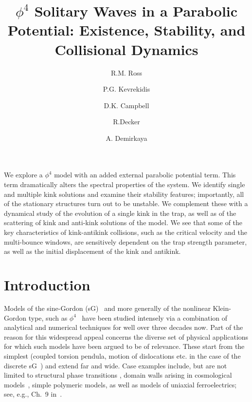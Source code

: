 \documentclass[vecphys]{svmult}		%
\begin{document}

\def\jcmindex#1{\index{#1}}
\def\myidxeffect#1{{\bf\large #1}}

\title*{$\phi^4$ Solitary Waves in a Parabolic Potential: Existence, Stability, and Collisional Dynamics}
%
\author{
R.M. Ross
\and
P.G. Kevrekidis
\and
D.K. Campbell
\and
R.Decker
\and
A. Demirkaya
}

%
\maketitle
%
\abstract
{
We explore a $\phi^4$ model with an added external parabolic
  potential term. This term dramatically alters the spectral properties
  of the system.
  We identify single and multiple kink solutions and examine their
 stability features; importantly, all of the stationary structures
 turn out to be unstable.
 We complement these with a dynamical study of the evolution
 of a single kink in the trap, as well as of
  the scattering of kink and anti-kink solutions of the model. We see that some of the key characteristics of kink-antikink collisions, such as the critical velocity and the multi-bounce windows, are sensitively dependent on the trap strength
  parameter, as well as
  the initial displacement of the kink and antikink. 
}


\section{Introduction}
\label{sec:intro}


Models of the sine-Gordon (sG)~\cite{ussg} and more generally of the nonlinear
Klein-Gordon type, such as $\phi^4$~\cite{belova}
have been studied  intensely via a combination of analytical and numerical
techniques for
well over three decades now. Part of the reason for this widespread appeal
concerns the diverse set of physical applications for which such models have been
argued to be of relevance. These start from the simplest (coupled
torsion pendula, motion of dislocations etc. in the case of the discrete
sG~\cite{braun}) and extend far and wide. Case examples include,
but are not limited to structural phase transitions \cite{behera,gufan},
domain walls arising in cosmological models~\cite{vilenkin01,anninos},
simple polymeric models, as well as models of uniaxial
ferroelectrics; see, e.g., Ch.~9 in~\cite{Vach}.
\end{document}
